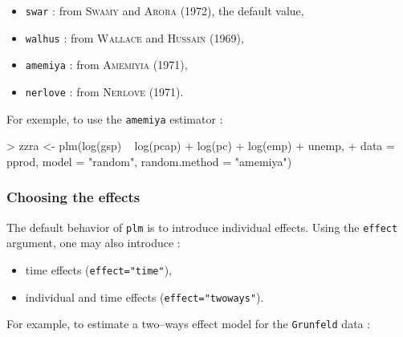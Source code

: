 \documentclass{article}
\begin{document}
\begin{itemize}
\item \texttt{swar} : from \textsc{Swamy} and \textsc{Arora}
  (1972), the default value,
\item \texttt{walhus} : from \textsc{Wallace} and \textsc{Hussain} (1969),
\item \texttt{amemiya} : from \textsc{Amemiyia} (1971),
\item \texttt{nerlove} : from \textsc{Nerlove} (1971).
\end{itemize}

For exemple, to use the \texttt{amemiya} estimator :

\begin{Schunk}
\begin{Sinput}
> zzra <- plm(log(gsp) ~ log(pcap) + log(pc) + log(emp) + unemp, 
+     data = pprod, model = "random", random.method = "amemiya")
\end{Sinput}
\end{Schunk}


\subsubsection{Choosing  the effects}

The default behavior of \texttt{plm} is to introduce individual
effects. Using the \texttt{effect} argument, one may also introduce :

\begin{itemize}
\item time effects (\texttt{effect="time"}),
\item individual and time effects (\texttt{effect="twoways"}).
\end{itemize}

For example, to estimate a two--ways effect model for the
\texttt{Grunfeld} data :
\end{document}
